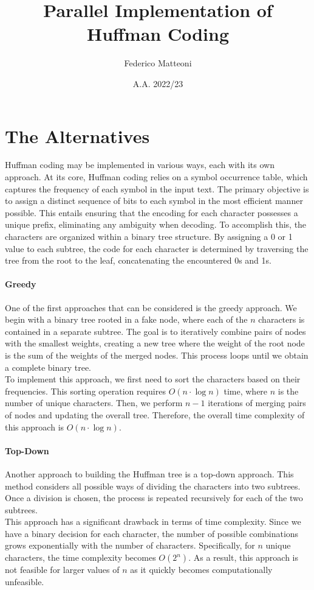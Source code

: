 \documentclass[10pt]{article}
\begin{document}
\title{Parallel Implementation of Huffman Coding}
\author{Federico Matteoni}
\date{A.A. 2022/23}
\maketitle

\section{The Alternatives}
Huffman coding may be implemented in various ways, each with its own approach. At its core, Huffman coding relies on a symbol occurrence table, which captures the frequency of each symbol in the input text. The primary objective is to assign a distinct sequence of bits to each symbol in the most efficient manner possible. This entails ensuring that the encoding for each character possesses a unique prefix, eliminating any ambiguity when decoding. To accomplish this, the characters are organized within a binary tree structure. By assigning a 0 or 1 value to each subtree, the code for each character is determined by traversing the tree from the root to the leaf, concatenating the encountered 0s and 1s.
\paragraph{Greedy} One of the first approaches that can be considered is the greedy approach. We begin with a binary tree rooted in a fake node, where each of the $n$ characters is contained in a separate subtree. The goal is to iteratively combine pairs of nodes with the smallest weights, creating a new tree where the weight of the root node is the sum of the weights of the merged nodes. This process loops until we obtain a complete binary tree.\\
To implement this approach, we first need to sort the characters based on their frequencies. This sorting operation requires $O(n\cdot\log n)$ time, where $n$ is the number of unique characters. Then, we perform $n-1$ iterations of merging pairs of nodes and updating the overall tree. Therefore, the overall time complexity of this approach is $O(n\cdot\log n)$.
\paragraph{Top-Down} Another approach to building the Huffman tree is a top-down approach. This method considers all possible ways of dividing the characters into two subtrees. Once a division is chosen, the process is repeated recursively for each of the two subtrees.\\
This approach has a significant drawback in terms of time complexity. Since we have a binary decision for each character, the number of possible combinations grows exponentially with the number of characters. Specifically, for $n$ unique characters, the time complexity becomes $O(2^n)$. As a result, this approach is not feasible for larger values of $n$ as it quickly becomes computationally unfeasible.
\end{document}

